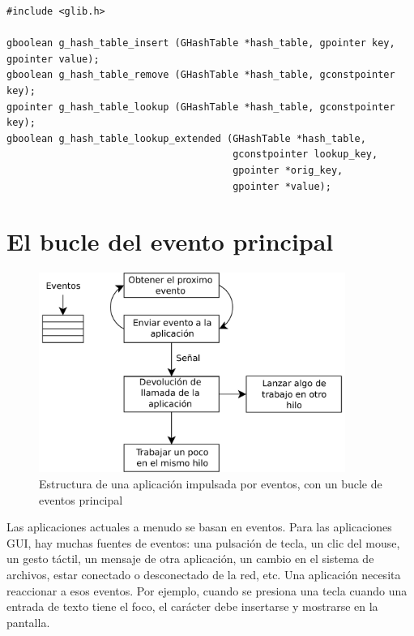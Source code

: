 \begin{lstlisting}[style=GLib/GTK, style=GLib/GTK, caption={Manipular una \lstinline{GHashTable}}, label=glib-hashmanip]
#include <glib.h>

gboolean g_hash_table_insert (GHashTable *hash_table, gpointer key, gpointer value);
gboolean g_hash_table_remove (GHashTable *hash_table, gconstpointer key);
gpointer g_hash_table_lookup (GHashTable *hash_table, gconstpointer key);
gboolean g_hash_table_lookup_extended (GHashTable *hash_table,
                                       gconstpointer lookup_key,
                                       gpointer *orig_key,
                                       gpointer *value);
\end{lstlisting}

\section{El bucle del evento principal}
\label{glib-main-event-loop}

\begin{figure}
  \begin{center}
    \includegraphics[width=10cm]{assets/img/event-loop.pdf}
    \caption{Estructura de una aplicación impulsada por eventos, con un bucle de eventos principal}
    \label{glib-event-loop}
  \end{center}
\end{figure}

Las aplicaciones actuales a menudo se basan en eventos. Para las aplicaciones GUI, hay muchas fuentes de eventos: una pulsación de tecla, un clic del mouse, un gesto táctil, un mensaje de otra aplicación, un cambio en el sistema de archivos, estar conectado o desconectado de la red, etc. Una aplicación necesita reaccionar a esos eventos. Por ejemplo, cuando se presiona una tecla cuando una entrada de texto tiene el foco, el carácter debe insertarse y mostrarse en la pantalla.

